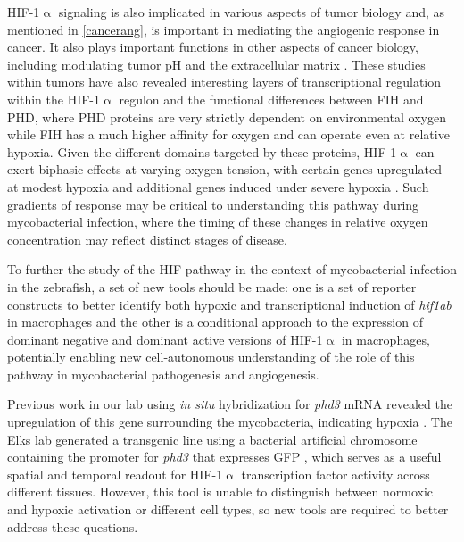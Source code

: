 HIF\hyp{}1$\upalpha$ signaling is also implicated in various aspects of tumor biology and, as mentioned in \autoref{cancerang}, is important in mediating the angiogenic response in cancer. It also plays important functions in other aspects of cancer biology, including modulating tumor pH and the extracellular matrix \citep{Dayan2008}. These studies within tumors have also revealed interesting layers of transcriptional regulation within the HIF\hyp{}1$\upalpha$ regulon and the functional differences between FIH and PHD, where PHD proteins are very strictly dependent on environmental oxygen while FIH has a much higher affinity for oxygen and can operate even at relative hypoxia. Given the different domains targeted by these proteins, HIF\hyp{}1$\upalpha$ can exert biphasic effects at varying oxygen tension, with certain genes upregulated at modest hypoxia and additional genes induced under severe hypoxia \citep{Dayan2008}. Such gradients of response may be critical to understanding this pathway during mycobacterial infection, where the timing of these changes in relative oxygen concentration may reflect distinct stages of disease.

To further the study of the HIF pathway in the context of mycobacterial infection in the zebrafish, a set of new tools should be made: one is a set of reporter constructs to better identify both hypoxic and transcriptional induction of \textit{hif1ab} in macrophages and the other is a conditional approach to the expression of dominant negative and dominant active versions of HIF\hyp{}1$\upalpha$ in macrophages, potentially enabling new cell\hyp{}autonomous understanding of the role of this pathway in mycobacterial pathogenesis and angiogenesis.

Previous work in our lab using \textit{in situ} hybridization for \textit{phd3} mRNA revealed the upregulation of this gene surrounding the mycobacteria, indicating hypoxia \citep{Oehlers2015}. The Elks lab generated a transgenic line using a bacterial artificial chromosome containing the promoter for \textit{phd3} that expresses GFP \citep{Santhakumar2012}, which serves as a useful spatial and temporal readout for HIF\hyp{}1$\upalpha$ transcription factor activity across different tissues. However, this tool is unable to distinguish between normoxic and hypoxic activation or different cell types, so new tools are required to better address these questions.

